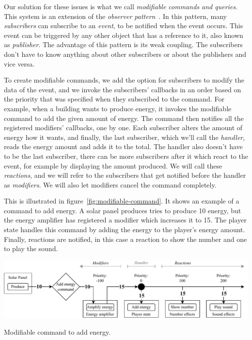 Our solution for these issues is what we call \emph{modifiable commands and queries}.
This system is an extension of the \emph{observer pattern}~\cite{Observer}.
In this pattern, many \emph{subscribers} can subscribe to an \emph{event}, to be notified when the event occurs.
This event can be triggered by any other object that has a reference to it, also known as \emph{publisher}.
The advantage of this pattern is its weak coupling.
The subscribers don't have to know anything about other subscribers or about the publishers and vice versa.

To create modifiable commands, we add the option for subscribers to modify the data of the event, and we invoke the subscribers' callbacks in an order based on the priority that was specified when they subscribed to the command.
For example, when a building wants to produce energy, it invokes the modifiable command to add the given amount of energy.
The command then notifies all the registered modifiers' callbacks, one by one.
Each subscriber alters the amount of energy how it wants, and finally, the last subscriber, which we'll call the \emph{handler}, reads the energy amount and adds it to the total.
The handler also doesn't have to be the last subscriber, there can be more subscribers after it which react to the event, for example by displaying the amount produced.
We will call these \emph{reactions}, and we will refer to the subscribers that get notified before the handler as \emph{modifiers}.
We will also let modifiers cancel the command completely.

This is illustrated in figure~\ref{fig:modifiable-command}.
It shows an example of a command to add energy.
A solar panel produces tries to produce 10 energy, but the energy amplifier has registered a modifier which increases it to 15.
The player state handles this command by adding the energy to the player's energy amount.
Finally, reactions are notified, in this case a reaction to show the number and one to play the sound.

\begin{center}
    \captionsetup{type=figure}
    \includegraphics[width=\textwidth]{img/modifiable command.pdf}
    \caption{Modifiable command to add energy.}
    \label{fig:modifiable-command}
\end{center}


